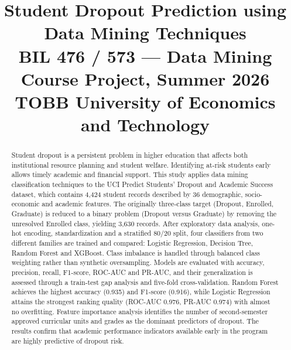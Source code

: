 \documentclass[conference]{IEEEtran}
\begin{document}
	
	\title{Student Dropout Prediction using Data Mining Techniques\\
		{\footnotesize BIL 476 / 573 --- Data Mining Course Project, Summer 2026\\
			TOBB University of Economics and Technology}
	}
	
	\author{
	}
	
	\maketitle
	
	\begin{abstract}
		Student dropout is a persistent problem in higher education that affects both institutional resource planning and student welfare. Identifying at-risk students early allows timely academic and financial support. This study applies data mining classification techniques to the UCI Predict Students' Dropout and Academic Success dataset, which contains 4,424 student records described by 36 demographic, socio-economic and academic features. The originally three-class target (Dropout, Enrolled, Graduate) is reduced to a binary problem (Dropout versus Graduate) by removing the unresolved Enrolled class, yielding 3,630 records. After exploratory data analysis, one-hot encoding, standardization and a stratified 80/20 split, four classifiers from two different families are trained and compared: Logistic Regression, Decision Tree, Random Forest and XGBoost. Class imbalance is handled through balanced class weighting rather than synthetic oversampling. Models are evaluated with accuracy, precision, recall, F1-score, ROC-AUC and PR-AUC, and their generalization is assessed through a train-test gap analysis and five-fold cross-validation. Random Forest achieves the highest accuracy (0.935) and F1-score (0.916), while Logistic Regression attains the strongest ranking quality (ROC-AUC 0.976, PR-AUC 0.974) with almost no overfitting. Feature importance analysis identifies the number of second-semester approved curricular units and grades as the dominant predictors of dropout. The results confirm that academic performance indicators available early in the program are highly predictive of dropout risk.
	\end{abstract}
	
\end{document}
